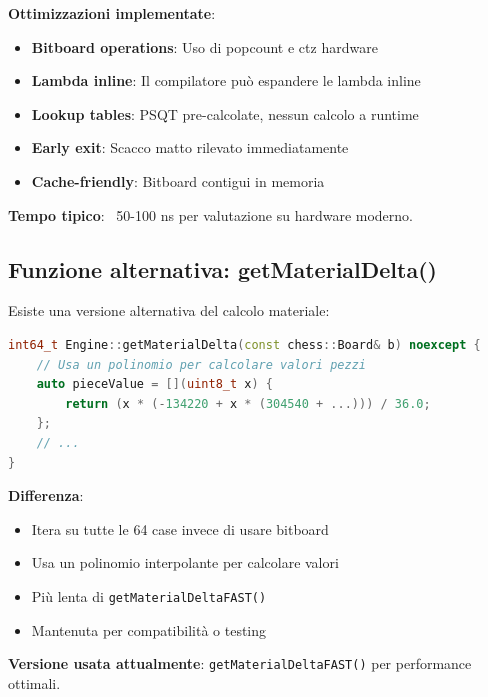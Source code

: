 \textbf{Ottimizzazioni implementate}:
\begin{itemize}
\item \textbf{Bitboard operations}: Uso di popcount e ctz hardware
\item \textbf{Lambda inline}: Il compilatore può espandere le lambda inline
\item \textbf{Lookup tables}: PSQT pre-calcolate, nessun calcolo a runtime
\item \textbf{Early exit}: Scacco matto rilevato immediatamente
\item \textbf{Cache-friendly}: Bitboard contigui in memoria
\end{itemize}

\textbf{Tempo tipico}: ~50-100 ns per valutazione su hardware moderno.

\subsection{Funzione alternativa: getMaterialDelta()}

Esiste una versione alternativa del calcolo materiale:

\begin{lstlisting}[language=C++]
int64_t Engine::getMaterialDelta(const chess::Board& b) noexcept {
    // Usa un polinomio per calcolare valori pezzi
    auto pieceValue = [](uint8_t x) {
        return (x * (-134220 + x * (304540 + ...))) / 36.0;
    };
    // ...
}
\end{lstlisting}

\textbf{Differenza}:
\begin{itemize}
\item Itera su tutte le 64 case invece di usare bitboard
\item Usa un polinomio interpolante per calcolare valori
\item Più lenta di \texttt{getMaterialDeltaFAST()}
\item Mantenuta per compatibilità o testing
\end{itemize}

\textbf{Versione usata attualmente}: \texttt{getMaterialDeltaFAST()} per performance ottimali.


